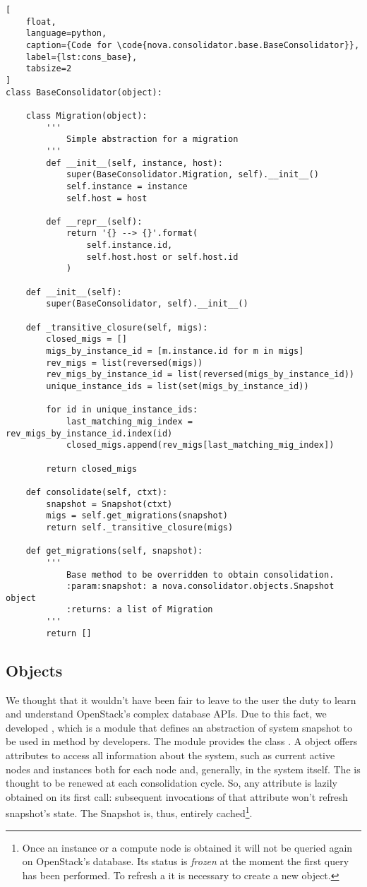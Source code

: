 \begin{lstlisting}[
	float,
	language=python,
	caption={Code for \code{nova.consolidator.base.BaseConsolidator}},
	label={lst:cons_base},
	tabsize=2
]
class BaseConsolidator(object):

	class Migration(object):
		'''
			Simple abstraction for a migration
		'''
		def __init__(self, instance, host):
			super(BaseConsolidator.Migration, self).__init__()
			self.instance = instance
			self.host = host

		def __repr__(self):
			return '{} --> {}'.format(
				self.instance.id,
				self.host.host or self.host.id
			)

	def __init__(self):
		super(BaseConsolidator, self).__init__()

	def _transitive_closure(self, migs):
		closed_migs = []
		migs_by_instance_id = [m.instance.id for m in migs]
		rev_migs = list(reversed(migs))
		rev_migs_by_instance_id = list(reversed(migs_by_instance_id))
		unique_instance_ids = list(set(migs_by_instance_id))

		for id in unique_instance_ids:
			last_matching_mig_index = rev_migs_by_instance_id.index(id)
			closed_migs.append(rev_migs[last_matching_mig_index])

		return closed_migs

	def consolidate(self, ctxt):
		snapshot = Snapshot(ctxt)
		migs = self.get_migrations(snapshot)
		return self._transitive_closure(migs)

	def get_migrations(self, snapshot):
		'''
			Base method to be overridden to obtain consolidation.
			:param:snapshot: a nova.consolidator.objects.Snapshot object
			:returns: a list of Migration
		'''
		return []
\end{lstlisting}

\subsection{Objects}
\label{sub:cons_obj}
We thought that it wouldn't have been fair to leave to the user the duty to learn and understand OpenStack's complex database APIs.
Due to this fact, we developed , which is a module that defines an abstraction of system snapshot to be used in method  by developers. The module provides the class . A  object offers attributes to access all information about the system, such as current active nodes and instances both for each node and, generally, in the system itself. The  is thought to be renewed at each consolidation cycle. So, any attribute is lazily obtained on its first call: subsequent invocations of that attribute won't refresh snapshot's state. The Snapshot is, thus, entirely cached\footnote{Once an instance or a compute node is obtained it will not be queried again on OpenStack's database. Its status is \emph{frozen} at the moment the first query has been performed. To refresh a  it is necessary to create a new  object.}.

